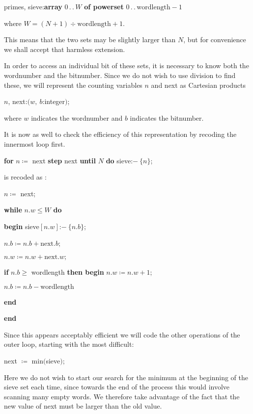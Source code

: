 \quad primes, sieve:\textbf{array} $0\,.\,.\,W$ \textbf{of powerset} $0\,.\,.\,\text{wordlength} - 1$

\noindent
where $W = (N + 1) \div \text{wordlength} + 1$.

\noindent
This means that the two sets may be slightly larger than $N$, but for convenience we shall accept that harmless extension.

In order to access an individual bit of these sets, it is necessary to know both the wordnumber and the bitnumber. Since we do not wish to use division to find these, we will represent the counting variables $n$ and next as Cartesian products

\quad $n$, next:$(w,\ b$:integer$)$;

\noindent
where $w$ indicates the wordnumber and $b$ indicates the bitnumber.

It is now as well to check the efficiency of this representation by recoding the innermost loop first.

\quad \textbf{for} $n\coloneq$ next \textbf{step} next \textbf{until} $N$ \textbf{do} sieve:$-\ \{n\}$;

\noindent
is recoded as :

\quad $n\coloneq$ next;

\quad \textbf{while} $n.w \leqslant W$ \textbf{do}

\quad \quad \textbf{begin} sieve$[n.w]$:$-\ \{n.b\}$;

\quad \quad \quad $n.b\coloneq n.b + \text{next}.b$;

\quad \quad \quad $n.w\coloneq n.w + \text{next}.w;$

\quad \quad \quad \textbf{if} $n.b \geqslant$ wordlength \textbf{then begin} $n.w \coloneq n.w + 1$;

\quad \quad \quad \quad $n.b \coloneq n.b - \text{wordlength}$

\quad \quad \quad \textbf{end}

\quad \quad \textbf{end}

\noindent
Since this appears acceptably efficient we will code the other operations of the outer loop, starting with the most difficult:

\quad next $\coloneq$ min$($sieve$)$;

\noindent
Here we do not wish to start our search for the minimum at the beginning of the sieve set each time, since towards the end of the process this would involve scanning many empty words. We therefore take advantage of the fact that the new value of next must be larger than the old value.


